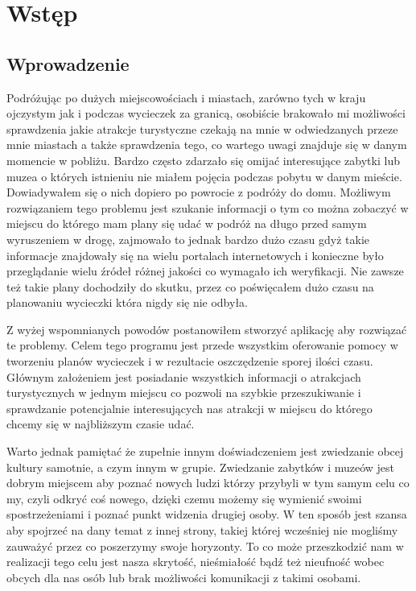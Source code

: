\section{Wstęp}
    \subsection{Wprowadzenie}
    Podróżując po dużych miejscowościach i miastach, zarówno tych w kraju ojczystym jak i podczas wycieczek za granicą, osobiście brakowało mi możliwości sprawdzenia jakie atrakcje turystyczne czekają na mnie w odwiedzanych przeze mnie miastach a także sprawdzenia tego, co wartego uwagi znajduje się w danym momencie w pobliżu. Bardzo często zdarzało się omijać interesujące zabytki lub muzea o których istnieniu nie miałem pojęcia podczas pobytu w danym mieście. Dowiadywałem się o nich dopiero po powrocie z podróży do domu. Możliwym rozwiązaniem tego problemu jest szukanie informacji o tym co można zobaczyć w miejscu do którego mam plany się udać w podróż na długo przed samym wyruszeniem w drogę, zajmowało to jednak bardzo dużo czasu gdyż takie informacje znajdowały się na wielu portalach internetowych i konieczne było przeglądanie wielu źródeł różnej jakości co wymagało ich weryfikacji. Nie zawsze też takie plany dochodziły do skutku, przez co poświęcałem dużo czasu na planowaniu wycieczki która nigdy się nie odbyła.
    
    Z wyżej wspomnianych powodów postanowiłem stworzyć aplikację aby rozwiązać te problemy. Celem tego programu jest przede wszystkim oferowanie pomocy w tworzeniu planów wycieczek i w rezultacie oszczędzenie sporej ilości czasu. Głównym założeniem jest posiadanie wszystkich informacji o atrakcjach turystycznych w jednym miejscu co pozwoli na szybkie przeszukiwanie i sprawdzanie potencjalnie interesujących nas atrakcji w miejscu do którego chcemy się w najbliższym czasie udać.
    
    Warto jednak pamiętać że zupełnie innym doświadczeniem jest zwiedzanie obcej kultury samotnie, a czym innym w grupie. Zwiedzanie zabytków i muzeów jest dobrym miejscem aby poznać nowych ludzi którzy przybyli w tym samym celu co my, czyli odkryć coś nowego, dzięki czemu możemy się wymienić swoimi spostrzeżeniami i poznać punkt widzenia drugiej osoby. W ten sposób jest szansa aby spojrzeć na dany temat z innej strony, takiej której wcześniej nie mogliśmy zauważyć przez co poszerzymy swoje horyzonty. To co może przeszkodzić nam w realizacji tego celu jest nasza skrytość, nieśmiałość bądź też nieufność wobec obcych dla nas osób lub brak możliwości komunikacji z takimi osobami.

